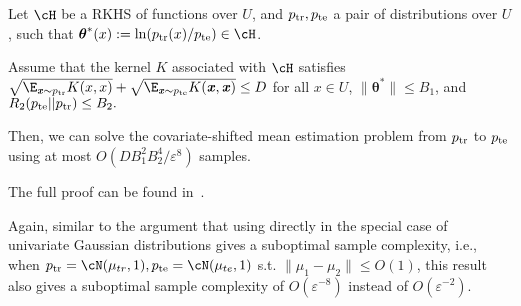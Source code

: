 \begin{theorem}
\label{thm:covariate-shift-kernel-logistic-regression}
    Let $\cH$ be a RKHS of functions over $U$, and $p_{\mathrm{tr}}, p_{\mathrm{te}}$ a pair of distributions over $U$, such that $\boldsymbol{\theta}^*(x) := \ln (\ptr(x) / \pte) \in \cH$.

    Assume that the kernel $K$ associated with $\cH$ satisfies $\sqrt{\E_{\xx \sim \ptr} K(x,x)} + \sqrt{\E_{\xx \sim \pte} K(\xx, \xx)} \leq D$ for all $x \in U$,  $\|\boldsymbol{\theta}^*\| \leq B_1$, and $R_2(p_{\mathrm{te}} || p_{\mathrm{tr}}) \leq B_2.$

    Then, we can solve the covariate-shifted mean estimation problem from $p_{\mathrm{tr}}$ to $p_{\mathrm{te}}$ using at most $O(D B_1^2 B_2^4 / \varepsilon^8)$ samples.
\end{theorem}
The full proof can be found in~.

Again, similar to the argument that using  directly in the special case of univariate Gaussian distributions gives a suboptimal sample complexity, i.e., when $\ptr = \cN(\mu_{tr}, 1), \pte = \cN(\mu_{te}, 1)$  s.t. $\|\mu_1 - \mu_2\| \leq O(1)$, this result also gives a suboptimal sample complexity of $O(\varepsilon^{-8})$ instead of $O(\varepsilon^{-2})$.